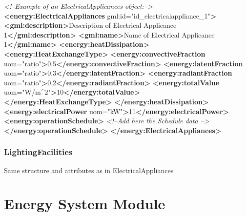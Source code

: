 \documentclass[a4paper,12pt]{article}
\newenvironment{Shaded}{}{}
\newcommand{\KeywordTok}[1]{\textcolor[rgb]{0.00,0.44,0.13}{\textbf{{#1}}}}
\newcommand{\StringTok}[1]{\textcolor[rgb]{0.25,0.44,0.63}{{#1}}}
\newcommand{\CommentTok}[1]{\textcolor[rgb]{0.38,0.63,0.69}{\textit{{#1}}}}
\newcommand{\OtherTok}[1]{\textcolor[rgb]{0.00,0.44,0.13}{{#1}}}
\newcommand{\NormalTok}[1]{{#1}}
\let\stdsection\section%
\renewcommand\section{\newpage\stdsection}
\begin{document}
\begin{Shaded}
\begin{Highlighting}[]
\CommentTok{<!--Example of an ElectricalApplicances object:-->}
\KeywordTok{<energy:ElectricalAppliances}\OtherTok{ gml:id=}\StringTok{"id_electricalappliance_1"}\KeywordTok{>}
    \KeywordTok{<gml:description>}\NormalTok{Description of Electrical Applicance 1}\KeywordTok{</gml:description>}
    \KeywordTok{<gml:name>}\NormalTok{Name of Electrical Applicance 1}\KeywordTok{</gml:name>}
    \KeywordTok{<energy:heatDissipation>}
        \KeywordTok{<energy:HeatExchangeType>}
            \KeywordTok{<energy:convectiveFraction}\OtherTok{ uom=}\StringTok{"ratio"}\KeywordTok{>}\NormalTok{0.5}\KeywordTok{</energy:convectiveFraction>}
            \KeywordTok{<energy:latentFraction}\OtherTok{ uom=}\StringTok{"ratio"}\KeywordTok{>}\NormalTok{0.3}\KeywordTok{</energy:latentFraction>}
            \KeywordTok{<energy:radiantFraction}\OtherTok{ uom=}\StringTok{"ratio"}\KeywordTok{>}\NormalTok{0.2}\KeywordTok{</energy:radiantFraction>}
            \KeywordTok{<energy:totalValue}\OtherTok{ uom=}\StringTok{"W/m^2"}\KeywordTok{>}\NormalTok{10}\KeywordTok{</energy:totalValue>}
        \KeywordTok{</energy:HeatExchangeType>}
    \KeywordTok{</energy:heatDissipation>}
    \KeywordTok{<energy:electricalPower}\OtherTok{ uom=}\StringTok{"kW"}\KeywordTok{>}\NormalTok{11}\KeywordTok{</energy:electricalPower>}
    \KeywordTok{<energy:operationSchedule>}
        \CommentTok{<!--Add here the Schedule data -->}  
    \KeywordTok{</energy:operationSchedule>} 
\KeywordTok{</energy:ElectricalAppliances>}
\end{Highlighting}
\end{Shaded}

\subsubsection{LightingFacilities}\label{lightingfacilities}

Same structure and attributes as in ElectricalAppliances

\section{Energy System Module}\label{energy-system-module}
\end{document}
